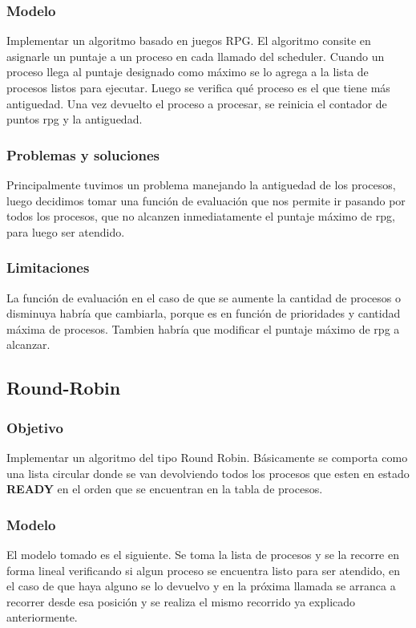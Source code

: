 \documentclass[10pt,a4paper]{article}
\begin{document}
	\subsubsection{Modelo}
		Implementar un algoritmo basado en juegos RPG. El algoritmo consite en asignarle un puntaje a un proceso en cada llamado del scheduler. Cuando un proceso llega al puntaje designado como m\'aximo se lo agrega a la lista de procesos listos para ejecutar. Luego se verifica qu\'e proceso es el que tiene m\'as antiguedad. Una vez devuelto el proceso a procesar, se reinicia el contador de puntos rpg y la antiguedad.
	\subsubsection{Problemas y soluciones}
		Principalmente tuvimos un problema manejando la antiguedad de los procesos, luego decidimos tomar una funci\'on de evaluaci\'on que nos permite ir pasando por todos los procesos, que no alcanzen inmediatamente el puntaje m\'aximo de rpg, para luego ser atendido.
	\subsubsection{Limitaciones}
		La funci\'on de evaluaci\'on en el caso de que se aumente la cantidad de procesos o disminuya habr\'ia que cambiarla, porque es en funci\'on de prioridades y cantidad m\'axima de procesos. Tambien habr\'ia que modificar el puntaje m\'aximo de rpg a alcanzar.

\subsection{Round-Robin}
	\subsubsection{Objetivo}
		Implementar un algoritmo del tipo Round Robin. B\'asicamente se comporta como una lista circular donde se van devolviendo todos los procesos que esten en estado \textbf{READY} en el orden que se encuentran en la tabla de procesos.
	\subsubsection{Modelo}
		El modelo tomado es el siguiente. Se toma la lista de procesos y se la recorre en forma lineal verificando si algun proceso se encuentra listo para ser atendido, en el caso de que haya alguno se lo devuelvo y en la pr\'oxima llamada se arranca a recorrer desde esa posici\'on y se realiza el mismo recorrido ya explicado anteriormente.
\end{document}
